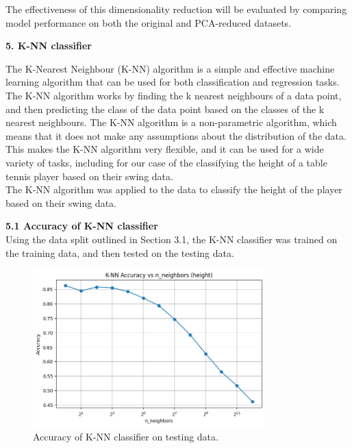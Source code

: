 \documentclass[12pt]{article}
\begin{document}
The effectiveness of this dimensionality reduction will be evaluated by comparing model performance on both the original and PCA-reduced datasets.

\vspace{20pt}

\textbf{5. K-NN classifier}

The K-Nearest Neighbour (K-NN) algorithm is a simple and effective machine learning algorithm that can be used for both classification and regression tasks. The K-NN algorithm works by finding the k nearest neighbours of a data point, and then predicting the class of the data point based on the classes of the k nearest neighbours. The K-NN algorithm is a non-parametric algorithm, which means that it does not make any assumptions about the distribution of the data. This makes the K-NN algorithm very flexible, and it can be used for a wide variety of tasks, including for our case of the classifying the height of a table tennis player based on their swing data.
\\
The K-NN algorithm was applied to the data to classify the height of the player based on their swing data.


\vspace{20pt}


\textbf{5.1 Accuracy of K-NN classifier}
\\
Using the data split outlined in Section 3.1, the K-NN classifier was trained on the training data, and then tested on the testing data. 

\begin{figure}[h!]
\centering
\includegraphics[width=0.8\textwidth]{figures/knn_accuracy.png}
\caption{Accuracy of K-NN classifier on testing data.}
\label{fig:knn_accuracy}
\end{figure}
\end{document}
